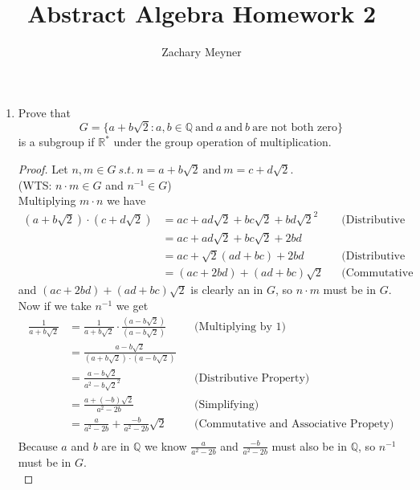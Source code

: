 \documentclass[12pt]{article}
\title{\large Abstract Algebra Homework 2}
\author{\large Zachary Meyner}
\date{}
\newcommand\setitemnumber[1]{\setcounter{enumi}{\numexpr#1-1\relax}}
\begin{document}
\maketitle
\begin{enumerate}[label=\textbf{\arabic*}.]
	\setitemnumber{41}
	\item Prove that
	      \[G=\{a+b\sqrt{2}: a,b \in \mathbb{Q} \ \text{and} \ a \ \text{and} \ b \ \text{are not both zero}\}\]
	      is a subgroup if $\mathbb{R}^*$ under the group operation of multiplication.
	      \begin{proof} Let $n,m \in G \ s.t. \ n = a+b\sqrt{2} \ \text{and} \ m = c+d\sqrt{2}$. \\
            (WTS\@: $n \cdot m \in G$ and $n^{-1} \in G$) \\
            Multiplying $m \cdot n$ we have 
            \begin{align*}
                (a+b\sqrt{2}) \cdot (c+d\sqrt{2}) &= ac+ad\sqrt{2} + bc\sqrt{2} + bd\sqrt{2}^2 && \text{(Distributive Property)} \\
                &= ac + ad\sqrt2 +bc\sqrt2 + 2bd  \\
                &= ac + \sqrt{2}(ad+bc) + 2bd && \text{(Distributive Property)} \\
                &= (ac + 2bd) + (ad + bc)\sqrt{2} && \text{(Commutative and Associative Property)}
            \end{align*}
            and $(ac+2bd) + (ad+bc)\sqrt{2}$ is clearly an in $G$, so $n \cdot m$ must be in $G$.
            Now if we take $n^{-1}$ we get
            \begin{align*}
                \frac{1}{a+b\sqrt{2}} &= \frac{1}{a+b\sqrt{2}} \cdot \frac{(a-b\sqrt{2})}{(a-b\sqrt{2})} && \text{(Multiplying by 1)} \\
                &= \frac{a-b\sqrt{2}}{(a+b\sqrt{2})\cdot(a-b\sqrt{2})} \\
                &= \frac{a-b\sqrt{2}}{a^2-b\sqrt{2}^2} && \text{(Distributive Property)} \\
                &= \frac{a+(-b)\sqrt{2}}{a^2-2b} && \text{(Simplifying)} \\
                &= \frac{a}{a^2-2b} + \frac{-b}{a^2-2b}\sqrt{2} && \text{(Commutative and Associative Propety)} \\
            \end{align*} 
            Because $a$ and $b$ are in $\mathbb{Q}$ we know $\frac{a}{a^2-2b}$ and $\frac{-b}{a^2-2b}$ must also be in $\mathbb{Q}$, so $n^{-1}$ must be in $G$. \\

\end{proof}
\end{enumerate}
\end{document}
